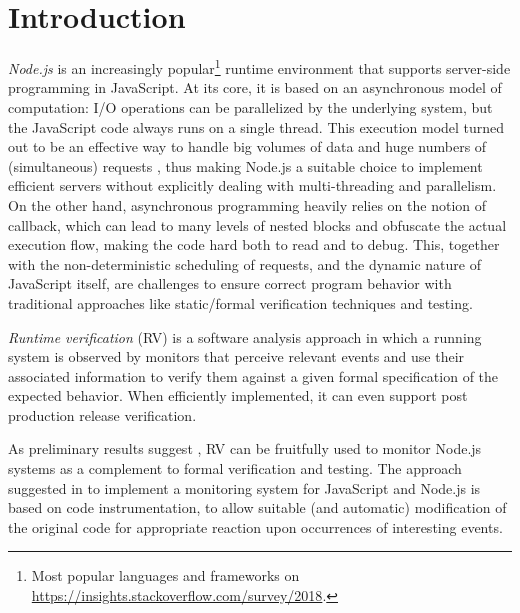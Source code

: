 \section{Introduction}
\emph{Node.js} is an increasingly popular\footnote{Most popular languages and frameworks on \url{https://insights.stackoverflow.com/survey/2018}.} runtime environment that supports server-side programming in JavaScript.
At its core, it is based on an asynchronous model of computation:
I/O operations can be parallelized by the underlying system, but the JavaScript code always runs on a single thread.
This execution model turned out to be an effective way to handle big volumes of data and huge numbers of (simultaneous) requests \cite{Nodejs10,NodejsPerformance14}, thus making Node.js a suitable choice to implement efficient servers without explicitly dealing with multi-threading and parallelism.
%
%
%
%
On the other hand, asynchronous programming heavily relies on the notion of callback, which can lead to many levels of nested blocks and obfuscate the actual execution flow, making the code hard both to read and to debug.
This, together with the non-deterministic scheduling of requests, and the dynamic nature of JavaScript itself, are challenges to ensure correct program behavior with traditional approaches like static/formal verification techniques and testing.

\emph{Runtime verification} (RV) \cite{rv} is a software analysis approach in which a running system is observed by monitors that perceive relevant events and use their associated information to verify them against a given formal specification of the expected behavior.
When efficiently implemented, it can even support post production release verification.

As preliminary results suggest \cite{TowardsIoT17}, RV can be fruitfully used to monitor Node.js systems as a complement to formal verification and testing.
The approach suggested in \cite{TowardsIoT17} to implement a monitoring system for JavaScript and Node.js is based on code instrumentation, to allow suitable (and automatic) modification of the original code for appropriate reaction upon occurrences of interesting events.

